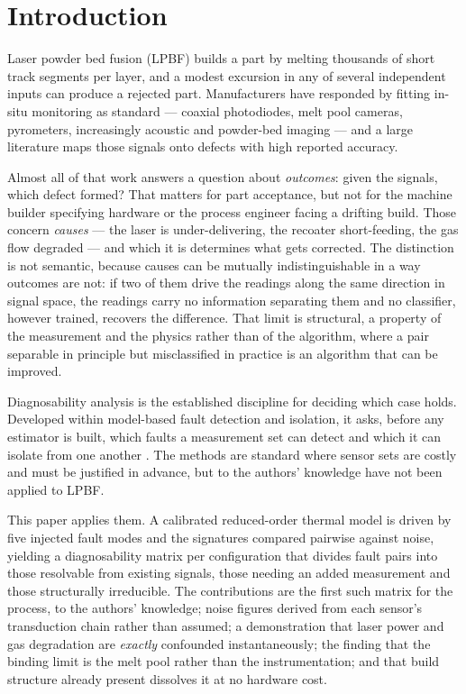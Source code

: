 \documentclass[preprint,times]{elsarticle}
\begin{document}
\section{Introduction}

Laser powder bed fusion (LPBF) builds a part by melting thousands of short track
segments per layer, and a modest excursion in any of several independent inputs
can produce a rejected part. Manufacturers have responded by fitting in-situ
monitoring as standard --- coaxial photodiodes, melt pool cameras, pyrometers,
increasingly acoustic and powder-bed imaging --- and a large literature maps
those signals onto defects with high reported accuracy.

Almost all of that work answers a question about \emph{outcomes}: given the
signals, which defect formed? That matters for part acceptance, but not for the
machine builder specifying hardware or the process engineer facing a drifting
build. Those concern \emph{causes} --- the laser is under-delivering, the
recoater short-feeding, the gas flow degraded --- and which it is determines what
gets corrected. The distinction is not semantic, because causes can be mutually
indistinguishable in a way outcomes are not: if two of them drive the readings
along the same direction in signal space, the readings carry no information
separating them and no classifier, however trained, recovers the difference. That
limit is structural, a property of the measurement and the physics rather than of
the algorithm, where a pair separable in principle but misclassified in practice
is an algorithm that can be improved.

Diagnosability analysis is the established discipline for deciding which case
holds. Developed within model-based fault detection and isolation, it asks,
before any estimator is built, which faults a measurement set can detect and
which it can isolate from one another \cite{Krysander2008}. The methods
are standard where sensor sets are costly and must be justified in advance, but
to the authors' knowledge have not been applied to LPBF.

This paper applies them. A calibrated reduced-order thermal model is driven by
five injected fault modes and the signatures compared pairwise against noise,
yielding a diagnosability matrix per configuration that divides fault pairs into
those resolvable from existing signals, those needing an added measurement and
those structurally irreducible. The contributions are the first such matrix for
the process, to the authors' knowledge; noise figures derived from each sensor's
transduction chain rather than assumed; a demonstration that laser power and gas
degradation are \emph{exactly} confounded instantaneously; the finding that the
binding limit is the melt pool rather than the instrumentation; and that build
structure already present dissolves it at no hardware cost.
\end{document}
